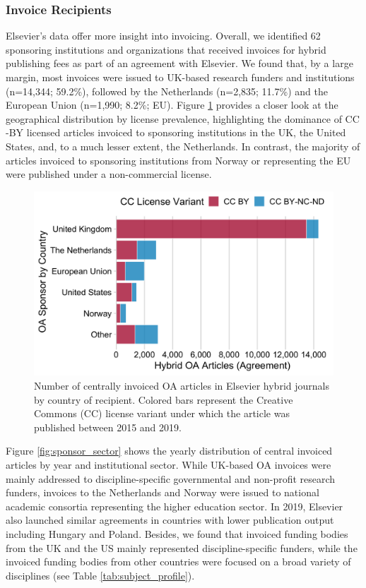 \documentclass[a4paper,man,floatsintext,longtable,noextraspace,12pt]{apa6}
\begin{document}
\hypertarget{invoice-recipients}{%
\subsubsection*{Invoice Recipients}\label{invoice-recipients}}

Elsevier's data offer more insight into invoicing. Overall, we
identified 62 sponsoring institutions and organizations that received
invoices for hybrid publishing fees as part of an agreement with
Elsevier. We found that, by a large margin, most invoices were issued to
UK-based research funders and institutions (n=14,344; 59.2\%), followed
by the Netherlands (n=2,835; 11.7\%) and the European Union (n=1,990;
8.2\%; EU). Figure \ref{fig:invoice_sponsor_country} provides a closer
look at the geographical distribution by license prevalence,
highlighting the dominance of CC -BY licensed articles invoiced to
sponsoring institutions in the UK, the United States, and, to a much
lesser extent, the Netherlands. In contrast, the majority of articles
invoiced to sponsoring institutions from Norway or representing the EU
were published under a non-commercial license.

\begin{figure}[H]

{\centering \includegraphics[width=0.7\linewidth,]{manuscript_files/figure-latex/invoice_sponsor_country-1} 

}

\caption{Number of centrally invoiced OA articles in Elsevier hybrid journals by country of recipient. Colored bars represent the Creative Commons (CC) license variant under which the article was published between 2015 and 2019.}\label{fig:invoice_sponsor_country}
\end{figure}

Figure \ref{fig:sponsor_sector} shows the yearly distribution of central
invoiced articles by year and institutional sector. While UK-based OA
invoices were mainly addressed to discipline-specific governmental and
non-profit research funders, invoices to the Netherlands and Norway were
issued to national academic consortia representing the higher education
sector. In 2019, Elsevier also launched similar agreements in countries
with lower publication output including Hungary and Poland. Besides, we
found that invoiced funding bodies from the UK and the US mainly
represented discipline-specific funders, while the invoiced funding
bodies from other countries were focused on a broad variety of
disciplines (see Table \ref{tab:subject_profile}).
\end{document}

